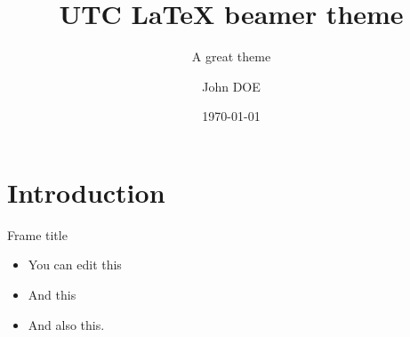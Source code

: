 \documentclass[aspectratio=169]{beamer}
\title{UTC LaTeX beamer theme}
\subtitle{A great theme}
\author{John DOE}
\institute{UTC / Heudiasyc Laboratory}
\date{\today}
\begin{document}
\frame[plain]{\utctitlepage}

\section{Introduction}

\begin{frame}{Frame title}
  \begin{itemize}
    \item You can edit this
    \item And this
    \item And also this.
  \end{itemize}
\end{frame}





\end{document}
